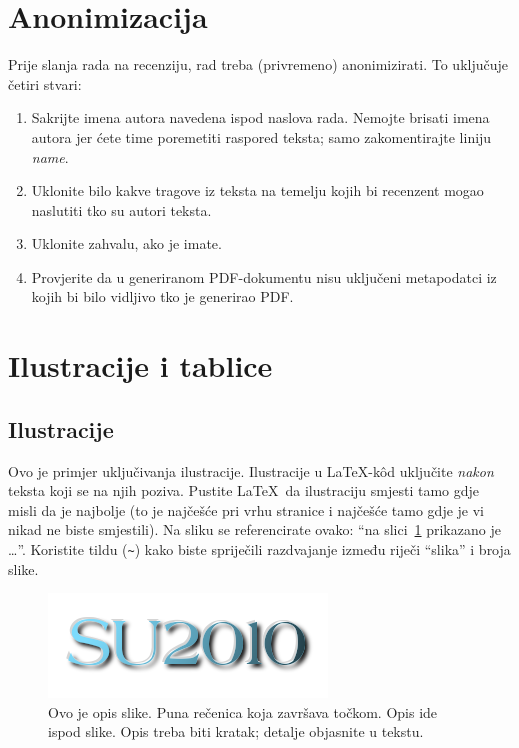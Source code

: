 \documentclass[10pt, a4paper]{article}
\begin{document}
\section{Anonimizacija}

Prije slanja rada na recenziju, rad treba (privremeno) anonimizirati.
To uključuje četiri stvari:

\begin{enumerate}

\item Sakrijte imena autora navedena ispod naslova rada. Nemojte
brisati imena autora jer ćete time poremetiti raspored teksta; samo
zakomentirajte liniju \emph{name}.

\item Uklonite bilo kakve tragove iz teksta na temelju kojih bi
recenzent mogao naslutiti tko su autori teksta.

\item Uklonite zahvalu, ako je imate.

\item Provjerite da u generiranom PDF-dokumentu nisu uključeni
metapodatci iz kojih bi bilo vidljivo tko je generirao PDF.

\end{enumerate}

\section{Ilustracije i tablice}

\subsection{Ilustracije}

Ovo je primjer uključivanja ilustracije. Ilustracije u \LaTeX-k\^od
uključite \emph{nakon} teksta koji se na njih poziva. Pustite \LaTeX\
da ilustraciju smjesti tamo gdje misli da je najbolje (to je najčešće
pri vrhu stranice i najčešće tamo gdje je vi nikad ne biste
smjestili).  Na sliku se referencirate ovako: ``na
slici~\ref{fig:slika1} prikazano je \dots''. Koristite tildu
(\verb.~.) kako biste spriječili razdvajanje između riječi ``slika'' i
broja slike.

\begin{figure}
\begin{center}
\includegraphics[width=\columnwidth]{su2010}
\caption{Ovo je opis slike. Puna rečenica koja završava točkom. Opis
ide ispod slike. Opis treba biti kratak; detalje objasnite u tekstu.}
\label{fig:slika1}
\end{center}
\end{figure}
\end{document}
